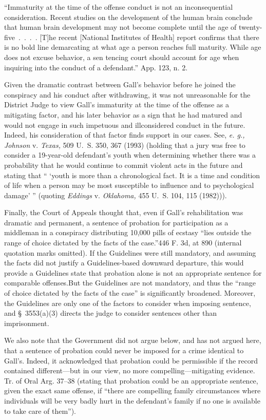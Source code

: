       ``Immaturity at the time of the offense conduct is not an
    inconsequential consideration. Recent studies on the development of
    the human brain conclude that human brain development may not become
    complete until the age of twenty-five~.~.~.~. [T]he recent
    [National Institutes of Health] report confirms that there is no
    bold line demarcating at what age a person reaches full maturity.
    While age does not excuse behavior, a sen tencing court should
    account for age when inquiring into the conduct of a defendant.''
    App. 123, n. 2.

  Given the dramatic contrast between Gall's behavior before he
joined the conspiracy and his conduct after withdrawing, it was not
unreasonable for the District Judge to view Gall's immaturity at the
time of the offense as a mitigating factor, and his later behavior
as a sign that he had matured and would not engage in such impetuous
and illconsidered conduct in the future. Indeed, his consideration of
that factor finds support in our cases. See, \emph{e. g., Johnson} v.
\emph{Texas,} 509 U.~S. 350, 367 (1993) (holding that a jury was free to
consider a 19-year-old defendant's youth when determining whether
there was a probability that he would continue to commit violent acts in
the future and stating that `` ‘youth is more than a chronological
fact. It is a time and condition of life when a person may be most
susceptible to influence and to psychological damage' '' (quoting
\emph{Eddings} v. \emph{Oklahoma,} 455 U.~S. 104, 115 (1982))).

  Finally, the Court of Appeals thought that, even if Gall's
rehabilitation was dramatic and permanent, a sentence of probation
for participation as a middleman in a conspiracy distributing 10,000
pills of ecstasy ``lies outside the range of choice dictated by the
facts of the case.''446 F. 3d, at 890 (internal quotation marks
omitted). If the Guidelines were still mandatory, and assuming the
facts did not justify a Guidelines-based downward departure, this
would provide a \newpage  Guidelines state that probation alone is not an
appropriate sentence for comparable offenses.\footnotemark[11] But the Guidelines
are not mandatory, and thus the ``range of choice dictated by the facts
of the case'' is significantly broadened. Moreover, the Guidelines
are only one of the factors to consider when imposing sentence, and
\S~3553(a)(3) directs the judge to consider sentences other than
imprisonment.

  We also note that the Government did not argue below, and has not
argued here, that a sentence of probation could never be imposed for
a crime identical to Gall's. Indeed, it acknowledged that probation
could be permissible if the record contained different---but in our
view, no more compelling---mitigating evidence. Tr. of Oral Arg.
37--38 (stating that probation could be an appropriate sentence, given
the exact same offense, if ``there are compelling family circumstances
where individuals will be very badly hurt in the defendant's family if
no one is available to take care of them'').

